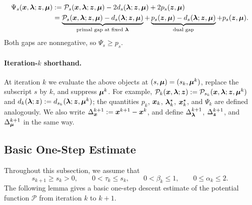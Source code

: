 \begin{equation}
\begin{aligned}
    \Psi_s(\bm{x},\bm{\lambda};\bm{z},\bm{\mu})
    &:={}
    \mathcal P_s(\bm{x},\bm{\lambda};\bm{z},\bm{\mu})
    -2d_s(\bm{\lambda};\bm{z},\bm{\mu})
    +2p_s(\bm{z},\bm{\mu}) \\
    &= \underbrace{\mathcal P_s(\bm{x},\bm{\lambda};\bm{z},\bm{\mu})-d_s(\bm{\lambda};\bm{z},\bm{\mu})}_{\text{primal gap at fixed }\bm{\lambda}}
     + \underbrace{p_s(\bm{z},\bm{\mu})-d_s(\bm{\lambda};\bm{z},\bm{\mu})}_{\text{dual gap}}
     + p_s(\bm{z},\bm{\mu}).
\end{aligned}
\label{eq:lyapunov-decomposition}
\end{equation}
Both gaps are nonnegative, so $\Psi_s\ge p_s$.

\paragraph{Iteration-$k$ shorthand.}
At iteration $k$ we evaluate the above objects at $(s,\bm{\mu})=(s_k,\bm{\mu}^k)$,
replace the subscript $s$ by $k$, and suppress $\bm{\mu}^k$. For example,
$\mathcal P_k(\bm{x},\bm{\lambda};\bm{z}):=\mathcal P_{s_k}(\bm{x},\bm{\lambda};\bm{z},\bm{\mu}^k)$ and
$d_k(\bm{\lambda};\bm{z}):=d_{s_k}(\bm{\lambda};\bm{z},\bm{\mu}^k)$; the quantities
$p_k$, $\bm{x}_k$, $\bm{\lambda}_k^\star$, $\bm{x}_k^\star$, and $\Psi_k$ are defined
analogously. We also write
$\Delta_{\bm{x}}^{k+1}:=\bm{x}^{k+1}-\bm{x}^k$, and define
$\Delta_{\bm{\lambda}}^{k+1}$, $\Delta_{\bm{z}}^{k+1}$, and $\Delta_{\bm{\mu}}^{k+1}$
in the same way.

\subsection{Basic One-Step Estimate}
\label{subsec:basic-one-step}

Throughout this subsection, we assume that 
\begin{equation}
    s_{k+1}\ge s_k>0,\qquad
    0 < \tau_k\le s_k,\qquad
    0<\beta_k\le1,\qquad
    0\le\alpha_k\le2.
    \label{eq:basic-parameter-condition}
\end{equation} 
The following lemma gives a basic one-step descent estimate of the potential function $\mathcal P$ from iteration $k$ to $k+1$.


